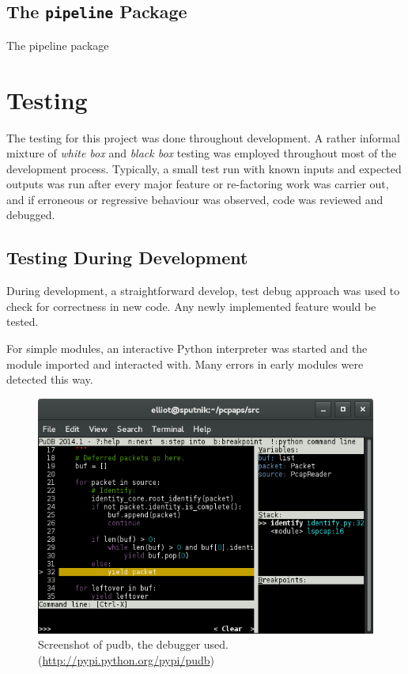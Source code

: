 \documentclass[10pt,a4paper,notitlepage,twoside]{report}
\begin{document}
\section{The \texttt{pipeline} Package}
The pipeline package 

\chapter{Testing}
The testing for this project was done throughout development. 
A rather informal mixture of \emph{white box} and \emph{black box} testing was employed throughout most of the development process. Typically, a small test run with known inputs and expected outputs was run after every major feature or re-factoring work was carrier out, and if erroneous or regressive behaviour was observed, code was reviewed and debugged.

\section{Testing During Development}
During development, a straightforward develop, test debug approach was used to check for correctness in new code. Any newly implemented feature would be tested.

For simple modules, an interactive Python interpreter was started and the module imported and interacted with. Many errors in early modules were detected this way.

\begin{figure}[H]
\center
\includegraphics[scale=0.75]{pictures/pudb.png}
\caption{Screenshot of pudb, the debugger used. (\url{http://pypi.python.org/pypi/pudb})}
\end{figure}
\end{document}
